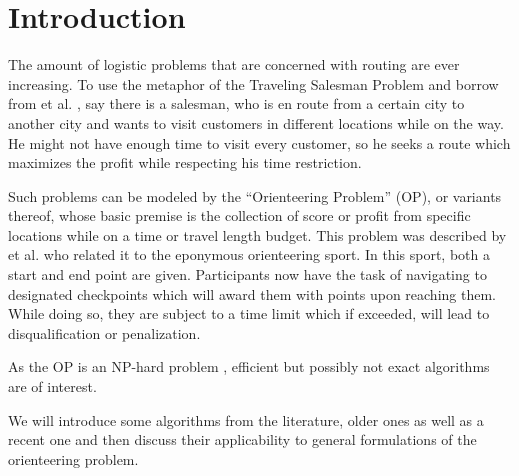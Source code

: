 \section{Introduction}
\label{sec:01:introduction}

The amount of logistic problems that are concerned with routing are ever increasing.
To use the metaphor of the Traveling Salesman Problem and borrow from \citeauthor{chao_fast_1996} et al. \cite{chao_fast_1996},
say there is a salesman, who is en route from a certain city to another city and wants to visit customers in different locations while on the way.
He might not have enough time to visit every customer, so he seeks a route which maximizes the profit while respecting his time restriction.

Such problems can be modeled by the \enquote{Orienteering Problem} (OP), or variants thereof,
whose basic premise is the collection of score or profit from specific locations while on a time or travel length budget. 
This problem was described by \citeauthor{tsiligiridis_heuristic_1984} et al. \cite{tsiligiridis_heuristic_1984} who related it to the eponymous orienteering sport.
In this sport, both a start and end point are given. Participants now have the task of navigating to designated checkpoints which will award them with points upon reaching them.
While doing so, they are subject to a time limit which if exceeded, will lead to disqualification or penalization.

As the OP is an NP-hard problem \cite{golden_orienteering_1987},
efficient but possibly not exact algorithms are of interest.

We will introduce some algorithms from the literature, older ones as well as a recent one 
and then discuss their applicability to general formulations of the orienteering problem. 
